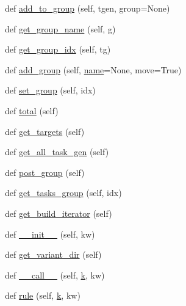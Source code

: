 \begin{DoxyCompactItemize}
\item 
def \hyperlink{classwaflib_1_1_build_1_1_build_context_a4454ed8386bb714afcd240eedc360720}{add\+\_\+to\+\_\+group} (self, tgen, group=None)
\item 
def \hyperlink{classwaflib_1_1_build_1_1_build_context_a70172b57dd578379f3de337a479d1463}{get\+\_\+group\+\_\+name} (self, g)
\item 
def \hyperlink{classwaflib_1_1_build_1_1_build_context_a8b0e6338acd281989d32dd8a1502e745}{get\+\_\+group\+\_\+idx} (self, tg)
\item 
def \hyperlink{classwaflib_1_1_build_1_1_build_context_a9e1a6200ab3e854ecc9041a5e9abaa78}{add\+\_\+group} (self, \hyperlink{lib_2expat_8h_a1b49b495b59f9e73205b69ad1a2965b0}{name}=None, move=True)
\item 
def \hyperlink{classwaflib_1_1_build_1_1_build_context_a00550c82b40990a204a19c29aee9bfe6}{set\+\_\+group} (self, idx)
\item 
def \hyperlink{classwaflib_1_1_build_1_1_build_context_a9242bac9596041fb6e91bd4f7cdbac51}{total} (self)
\item 
def \hyperlink{classwaflib_1_1_build_1_1_build_context_a11f1e63e72833ad88c0d58ffb29342d6}{get\+\_\+targets} (self)
\item 
def \hyperlink{classwaflib_1_1_build_1_1_build_context_a534cef50b471df8c60a8392209465f7f}{get\+\_\+all\+\_\+task\+\_\+gen} (self)
\item 
def \hyperlink{classwaflib_1_1_build_1_1_build_context_ae2c4605b1c701d8421f922205621f9df}{post\+\_\+group} (self)
\item 
def \hyperlink{classwaflib_1_1_build_1_1_build_context_a24789de45b2753c05b4a972ea7788dda}{get\+\_\+tasks\+\_\+group} (self, idx)
\item 
def \hyperlink{classwaflib_1_1_build_1_1_build_context_a7a7c250dce7990bdebc5d1d58047139a}{get\+\_\+build\+\_\+iterator} (self)
\item 
def \hyperlink{classwaflib_1_1_build_1_1_build_context_a04e1b540edfafc14247ff272cb62e604}{\+\_\+\+\_\+init\+\_\+\+\_\+} (self, kw)
\item 
def \hyperlink{classwaflib_1_1_build_1_1_build_context_acc99340a3386e41dc8d7b6b677db0536}{get\+\_\+variant\+\_\+dir} (self)
\item 
def \hyperlink{classwaflib_1_1_build_1_1_build_context_ad658b3ed93230daaed1fd1d25488df4b}{\+\_\+\+\_\+call\+\_\+\+\_\+} (self, \hyperlink{rfft2d_test_m_l_8m_adc468c70fb574ebd07287b38d0d0676d}{k}, kw)
\item 
def \hyperlink{classwaflib_1_1_build_1_1_build_context_a46943e460fe05c7285a5e14154afab6c}{rule} (self, \hyperlink{rfft2d_test_m_l_8m_adc468c70fb574ebd07287b38d0d0676d}{k}, kw)

\end{DoxyCompactItemize}
